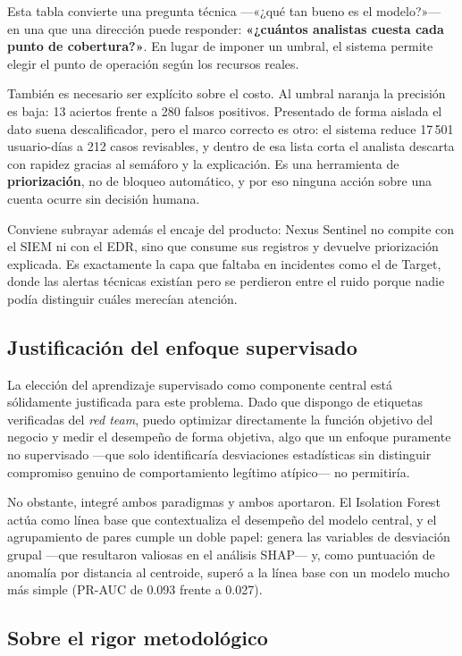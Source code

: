 \documentclass[12pt, a4paper]{article}
\begin{document}
Esta tabla convierte una pregunta técnica ---«¿qué tan bueno es el modelo?»--- en una que una
dirección puede responder: \textbf{«¿cuántos analistas cuesta cada punto de cobertura?»}. En lugar de
imponer un umbral, el sistema permite elegir el punto de operación según los recursos reales.

También es necesario ser explícito sobre el costo. Al umbral naranja la precisión es baja: 13
aciertos frente a 280 falsos positivos. Presentado de forma aislada el dato suena descalificador,
pero el marco correcto es otro: el sistema reduce 17\,501 usuario-días a 212 casos revisables, y
dentro de esa lista corta el analista descarta con rapidez gracias al semáforo y la explicación. Es
una herramienta de \textbf{priorización}, no de bloqueo automático, y por eso ninguna acción sobre
una cuenta ocurre sin decisión humana.

Conviene subrayar además el encaje del producto: Nexus Sentinel no compite con el SIEM ni con el
EDR, sino que consume sus registros y devuelve priorización explicada. Es exactamente la capa que
faltaba en incidentes como el de Target, donde las alertas técnicas existían pero se perdieron entre
el ruido porque nadie podía distinguir cuáles merecían atención.

\subsection{Justificación del enfoque supervisado}

La elección del aprendizaje supervisado como componente central está sólidamente justificada para
este problema. Dado que dispongo de etiquetas verificadas del \textit{red team}, puedo optimizar
directamente la función objetivo del negocio y medir el desempeño de forma objetiva, algo que un
enfoque puramente no supervisado ---que solo identificaría desviaciones estadísticas sin distinguir
compromiso genuino de comportamiento legítimo atípico--- no permitiría.

No obstante, integré ambos paradigmas y ambos aportaron. El Isolation Forest actúa como línea base
que contextualiza el desempeño del modelo central, y el agrupamiento de pares cumple un doble papel:
genera las variables de desviación grupal ---que resultaron valiosas en el análisis SHAP--- y, como
puntuación de anomalía por distancia al centroide, superó a la línea base con un modelo mucho más
simple (PR-AUC de 0.093 frente a 0.027).

\subsection{Sobre el rigor metodológico}
\end{document}

